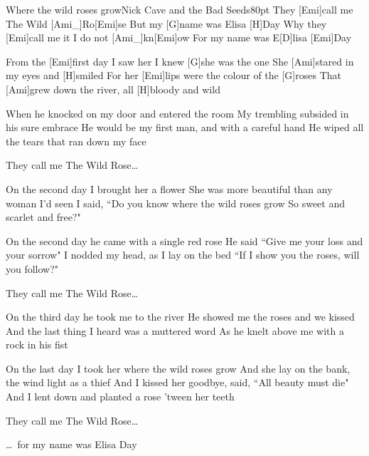 \begin{song}{Where the wild roses grow}{Nick Cave and the Bad Seeds}{80pt}
\chorus%
They [Emi]call me The Wild [Ami_]{Ro}[Emi]se
But my [G]name was Elisa [H]Day
Why they [Emi]call me it I do not [Ami_]{kn}[Emi]ow
For my name was E[D]lisa [Emi]Day

%
From the [Emi]first day I saw her I knew [G]she was the one
She [Ami]stared in my eyes and [H]smiled
For her [Emi]lips were the colour of the [G]roses
That [Ami]grew down the river, all [H]bloody and wild

When he knocked on my door and entered the room
My trembling subsided in his sure embrace
He would be my first man, and with a careful hand
He wiped all the tears that ran down my face

\chorus%
They call me The Wild Rose\dots

%
On the second day I brought her a flower
She was more beautiful than any woman I'd seen
I said, ``Do you know where the wild roses grow
So sweet and scarlet and free?"

On the second day he came with a single red rose
He said ``Give me your loss and your sorrow"
I nodded my head, as I lay on the bed
``If I show you the roses, will you follow?"

\chorus%
They call me The Wild Rose\dots

\vskip 20pt

%
On the third day he took me to the river
He showed me the roses and we kissed
And the last thing I heard was a muttered word
As he knelt above me with a rock in his fist

On the last day I took her where the wild roses grow
And she lay on the bank, the wind light as a thief
And I kissed her goodbye, said, ``All beauty must die"
And I lent down and planted a rose 'tween her teeth

\chorus%
They call me The Wild Rose\dots

\dots\ \rl for my name was Elisa Day
\end{song}
